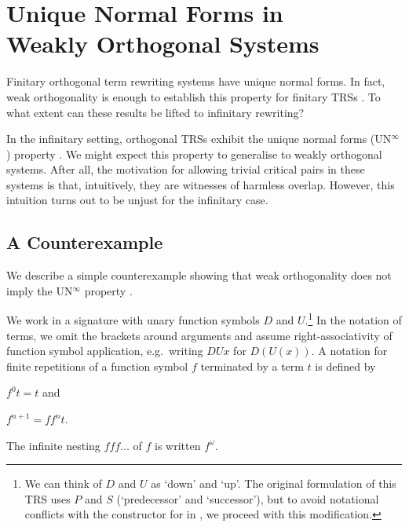 \chapter[\texorpdfstring{UN$^\infty$ in Weakly Orthogonal Systems}{UN
  in Weakly Orthogonal Systems}]{\texorpdfstring{Unique Normal Forms
    in\\Weakly Orthogonal Systems}{Unique Normal Forms in Weakly
    Orthogonal Systems}}\label{chap:unwo}

Finitary orthogonal term rewriting systems have unique normal forms.
In fact, weak orthogonality is enough to establish this
property for finitary TRSs \citep[Chapter 4]{terese-03}.
To what extent can these results be lifted to infinitary rewriting?

In the infinitary setting, orthogonal TRSs exhibit the unique
normal forms (UN$^\infty$) property
\citep{kennaway-95,klop-de-vrijer-05}. We might expect this property
to generalise to weakly orthogonal systems. After all, the motivation
for allowing trivial critical pairs in these systems is that,
intuitively, they are witnesses of harmless overlap. However, this
intuition turns out to be unjust for the infinitary case.


\section{A Counterexample}\label{sec:counterexample}

We describe a simple counterexample showing that weak orthogonality
does not imply the UN$^\infty$ property \citep{endrullis-10}.

We work in a signature with unary function symbols $D$ and
$U$.\footnote{We can think of $D$ and $U$ as `down' and `up'. The
  original formulation of this TRS uses $P$ and $S$ (`predecessor' and
  `successor'), but to avoid notational conflicts with the
  constructor for
  in \Coq, we proceed with this modification.}
In the notation of terms, we omit the brackets around arguments and
assume right-associativity of function symbol application,
e.g.\ writing $DUx$ for $D(U(x))$. A notation for finite repetitions
of a function symbol $f$ terminated by a term $t$ is defined by
\begin{inparaenum}[(i)]
\item $f^0 t = t$ and
\item $f^{n+1} = ff^nt$.
\end{inparaenum}
The infinite nesting $fff \ldots$ of $f$ is written $f^\omega$.

